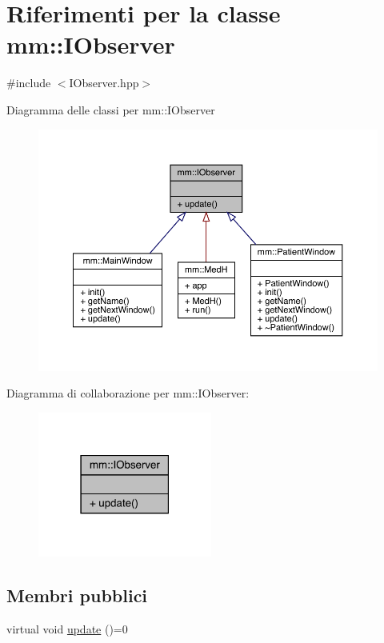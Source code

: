 \hypertarget{classmm_1_1_i_observer}{}\section{Riferimenti per la classe mm\+:\+:I\+Observer}
\label{classmm_1_1_i_observer}


{\ttfamily \#include $<$I\+Observer.\+hpp$>$}



Diagramma delle classi per mm\+:\+:I\+Observer\nopagebreak
\begin{figure}[H]
\begin{center}
\leavevmode
\includegraphics[width=350pt]{d4/dd5/classmm_1_1_i_observer__inherit__graph}
\end{center}
\end{figure}


Diagramma di collaborazione per mm\+:\+:I\+Observer\+:\nopagebreak
\begin{figure}[H]
\begin{center}
\leavevmode
\includegraphics[width=162pt]{d7/d84/classmm_1_1_i_observer__coll__graph}
\end{center}
\end{figure}
\subsection*{Membri pubblici}
\begin{DoxyCompactItemize}
\item 
virtual void \hyperlink{classmm_1_1_i_observer_a6422af04f8e9f3ba9d6d412a3bcdd03e}{update} ()=0
\end{DoxyCompactItemize}


